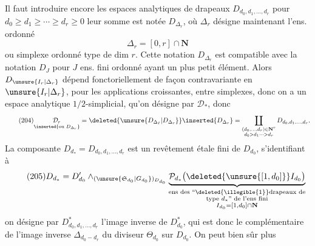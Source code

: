 Il faut introduire encore les espaces analytiques
de drapeaux $D_{d_0,d_1,\ldots,d_r}$ pour $d_0\geq d_1\geq\cdots\geq d_r\geq0$
leur somme est notée $D_{\Delta_r}$, où $\Delta_r$ désigne
maintenant l'ens. ordonné
\[
\tag{203}\Delta_r=[0,r]\cap\mathbf N
\]
ou simplexe ordonné type de dim $r$. Cette notation
$D_{\Delta_r}$ est compatible avec la notation $D_J$ pour $J$
ens. fini ordonné ayant un plus petit élément.
Alors $D_{\unsure{I_r|\Delta_r}}$ dépend fonctoriellement de façon
contravariante en $\unsure{I_r|\Delta_r}$, pour les applications
croissantes, entre simplexes, donc on a un
espace analytique $1/2$-simplicial, qu'on désigne par
$\mathcal D_*$, donc
\[
\tag{204}
\underset{\inserted{\text{ou }D_{\Delta_r}}}{\mathcal D_r}
=\deleted{\unsure{D_{\Delta_I}|D_{\Delta_r}}}\inserted{D_{\Delta_r}}
=\coprod_{\substack{(d_0,\ldots,d_r)\in\mathbf N^r\\d_0>d_1\cdots>d_r}}
D_{d_0,d_1,\ldots,d_r}.
\]
La composante $D_{d_*}=D_{d_0,d_1,\ldots,d_r}$ est
un revêtement étale fini de $D_{d_0}$, s'identifiant
à
\[
\tag{205}
D_{d_*}=D'_{d_0}\wedge_{(\unsure{\mathfrak S_{d_0}|G_{d_0}})_{D_{d_0}}}
\underbrace{\mathcal P_{d_*}\bigl(\deleted{\unsure{[1,d_0]}}I_{d_0}\bigr)}_{
\substack{\text{ens des ``\deleted{\illegible{1}}drapeaux de}\\
\text{type }d_*\text{'' de l'ens fini}\\I_{d_0}=[1,d_0]\cap\mathbf N}}
\]
on désigne par $D^*_{d_0,d_1,\ldots,d_r}$ l'image inverse
de $D^*_{d_0}$, qui est donc le complémentaire
de l'image inverse $\Delta_{d_0- d_r}$ du diviseur
$\Theta_{d_0}$ sur $D_{d_0}$. On peut bien sûr plus 

